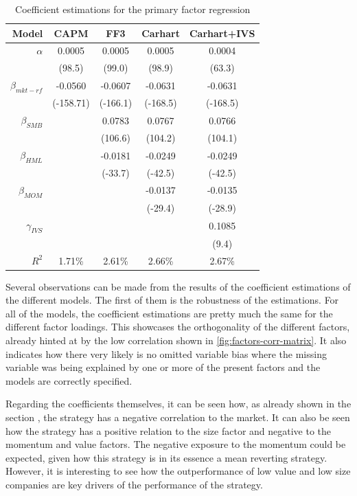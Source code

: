 \begin{table}[ht]
    \centering
    \begin{tabular}{rcccc}
        \toprule
        Model & CAPM & FF3 & Carhart & Carhart+IVS \\ 
        \midrule
        $\alpha$ & 0.0005 & 0.0005 & 0.0005 & 0.0004 \\
                 & (98.5) & (99.0) & (98.9) & (63.3) \\[8px]
        $\beta_{mkt-rf}$ & -0.0560 & -0.0607 & -0.0631 & -0.0631 \\
                         & (-158.71) & (-166.1) & (-168.5) & (-168.5) \\[8px]
        $\beta_{SMB}$ & & 0.0783 & 0.0767 & 0.0766 \\
                      & & (106.6) & (104.2) & (104.1) \\[8px]
        $\beta_{HML}$ & & -0.0181 & -0.0249 & -0.0249 \\
                      & & (-33.7) & (-42.5) & (-42.5) \\[8px]
        $\beta_{MOM}$ & & & -0.0137 & -0.0135 \\
                      & & & (-29.4) & (-28.9) \\[8px]
        $\gamma_{IVS}$ & & & & 0.1085 \\
                       & & & & (9.4) \\[8px]
        \midrule
        $R^2$ & 1.71\% & 2.61\% & 2.66\% & 2.67\% \\

        \bottomrule
    \end{tabular}
    \caption{Coefficient estimations for the primary factor regression}
    \label{table:primary-regression-results}
\end{table}

Several observations can be made from the results of the coefficient estimations of the different models. The first of them is the robustness of the estimations. For all of the models, the coefficient estimations are pretty much the same for the different factor loadings. This showcases the orthogonality of the different factors, already hinted at by the low correlation shown in \autoref{fig:factors-corr-matrix}. It also indicates how there very likely is no omitted variable bias where the missing variable was being explained by one or more of the present factors and the models are correctly specified.

Regarding the coefficients themselves, it can be seen how, as already shown in the section , the strategy has a negative correlation to the market. It can also be seen how the strategy has a positive relation to the size factor and negative to the momentum and value factors. The negative exposure to the momentum could be expected, given how this strategy is in its essence a mean reverting strategy. However, it is interesting to see how the outperformance of low value and low size companies are key drivers of the performance of the strategy. 

